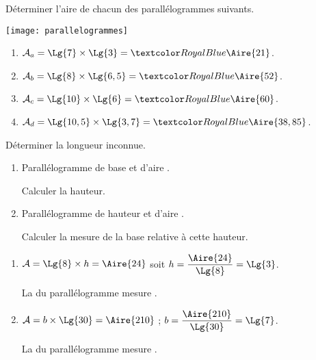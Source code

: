 \begin{Maquette}[Fiche,CorrigeFin,Colonnes=2]{}
\begin{multicols}{2}
      
      \begin{exercice} %
         Déterminer l'aire de chacun des parallélogrammes suivants.
         \begin{center}
            \texttt{[image: parallelogrammes]}
         \end{center}
      \end{exercice}
      
      \begin{Solution}
         \begin{enumerate}
            \item $\mathcal{A}_a =\Lg{7}\times\Lg{3} =\cor{\Aire{21}}$.
            \item $\mathcal{A}_b =\Lg{8}\times\Lg{6,5} =\cor{\Aire{52}}$.
            \item $\mathcal{A}_c =\Lg{10}\times\Lg{6} =\cor{\Aire{60}}$.
            \item $\mathcal{A}_d =\Lg{10,5}\times\Lg{3,7} =\cor{\Aire{38,85}}$.
         \end{enumerate}
      \end{Solution}
      
      
      \begin{exercice} %
         Déterminer la longueur inconnue.
         \begin{enumerate}
            \item Parallélogramme de base  et d'aire . \par
               Calculer la hauteur.
            \item Parallélogramme de hauteur  et d'aire . \par
               Calculer la mesure de la base relative à cette hauteur.
         \end{enumerate}
      \end{exercice}
      
      \begin{Solution}
         \begin{enumerate}
            \item $\mathcal{A} =\Lg{8}\times h =\Aire{24}$ soit $h =\dfrac{\Aire{24}}{\Lg{8}} =\Lg{3}$. \par \smallskip
               La  du parallélogramme mesure . \smallskip
            \item $\mathcal{A} =b\times\Lg{30} =\Aire{210}$ ; $b =\dfrac{\Aire{210}}{\Lg{30}} =\Lg{7}$. \par \smallskip
               La  du parallélogramme mesure \cor{7 cm}.
         \end{enumerate}
      \end{Solution}
      

\end{multicols}
\end{Maquette}
